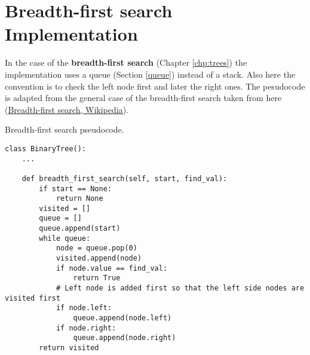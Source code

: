 \section{Breadth-first search Implementation}
In the case of the \textbf{breadth-first search} (Chapter \ref{chp:trees}) the implementation uses a queue (Section \ref{queue}) instead of a stack. Also here the convention is to check the left node first and later the right ones. The pesudocode is adapted from the general case of the breadth-first search taken from here \cite{wikibreadthfirst} (\href{https://en.wikipedia.org/wiki/Breadth-first_search}{Breadth-first search, Wikipedia}).

\begin{algorithm}[H]
	\DontPrintSemicolon
	\LinesNumbered
\caption{Breadth-first search pseudocode.}
\end{algorithm}

\begin{lstlisting}[firstnumber=1, caption={Breadth-first search implementation.}]
class BinaryTree():
	...

	def breadth_first_search(self, start, find_val):
		if start == None:
			return None
		visited = []
		queue = []
		queue.append(start)
		while queue:
			node = queue.pop(0)
			visited.append(node)
			if node.value == find_val:
				return True
			# Left node is added first so that the left side nodes are visited first
			if node.left:
				queue.append(node.left)
			if node.right:
				queue.append(node.right)
		return visited
\end{lstlisting}

